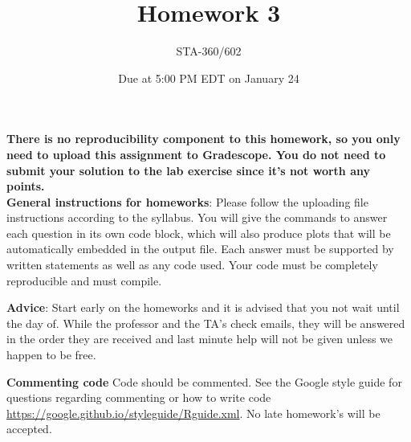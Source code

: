 \documentclass{article}
\begin{document}
\title{Homework 3}
\author{STA-360/602}
\date{Due at 5:00 PM EDT  on January 24}
\maketitle

\textbf{There is no reproducibility component to this homework, so you only need to upload this assignment to Gradescope. You do not need to submit your solution to the lab exercise since it's not worth any points.}\\

\textbf{General instructions for homeworks}: Please follow the uploading file instructions according to the syllabus. You will give the commands to answer each question in its own code block, which will also produce plots that will be automatically embedded in the output file. Each answer must be supported by written statements as well as any code used. Your code must be completely reproducible and must compile. 

\textbf{Advice}: Start early on the homeworks and it is advised that you not wait until the day of. While the professor and the TA's check emails, they will be answered in the order they are received and last minute help will not be given unless we happen to be free.  

\textbf{Commenting code}
Code should be commented. See the Google style guide for questions regarding commenting or how to write 
code \url{https://google.github.io/styleguide/Rguide.xml}. No late homework's will be accepted.


\end{document}
